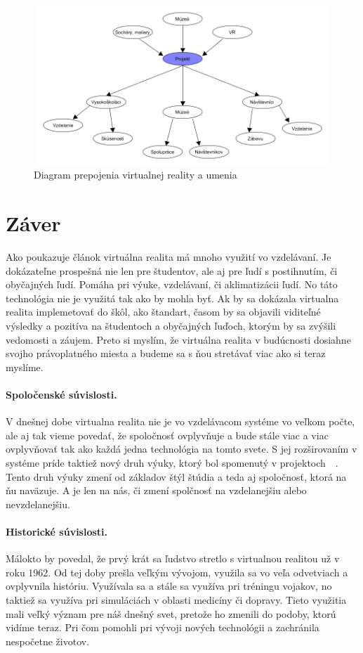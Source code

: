 \documentclass[10pt,oneside,slovak,a4paper]{article}
\begin{document}
 \begin{figure}[H]
 	\centering
 	\includegraphics[width=18cm,height=6cm,keepaspectratio]{diagram}
 	\caption[diagram]{Diagram prepojenia virtualnej reality a umenia}
 	\label{diagram}
 \end{figure} 

\section{Záver} \label{zaver} %

Ako poukazuje článok virtuálna realita má mnoho využití vo vzdelávaní. Je dokázateľne prospešná nie len pre študentov, ale aj pre ľudí s postihnutím, či obyčajných ľudí. Pomáha pri výuke, vzdelávaní, či aklimatizácii ľudí. No táto technológia nie je využitá tak ako by mohla byť. Ak by sa dokázala virtualna realita implemetovať do škôl, ako štandart, časom by sa objavili viditeľné výsledky a pozitíva na študentoch a obyčajných ľuďoch, ktorým by sa zvýšili vedomosti a záujem. Preto si myslím, že virtuálna realita v budúcnosti dosiahne svojho právoplatného miesta a budeme sa s ňou stretávať viac ako si teraz myslíme.

\paragraph{Spoločenské súvislosti.}V dnešnej dobe virtualna realita nie je vo vzdelávacom systéme vo veľkom počte, ale aj tak vieme povedať, že spoločnosť ovplyvňuje a bude stále viac a viac ovplyvňovať tak ako každá jedna technológia na tomto svete. S jej rozširovaním v systéme príde taktiež nový druh výuky, ktorý bol spomenutý v projektoch~\cite{Math}~\cite{Physics}. Tento druh výuky zmení od základov štýl štúdia a teda aj spoločnosť, ktorá na ňu naväzuje. A je len na nás, či zmení spolčnosť na vzdelanejšiu alebo nevzdelanejšiu.  

\paragraph{Historické súvislosti.}Málokto by povedal, že prvý krát sa ľudstvo stretlo s virtualnou realitou už v roku 1962. Od tej doby prešla veľkým vývojom, využila sa vo veľa odvetviach a ovplyvnila históriu. Využívala sa a stále sa využíva pri tréningu vojakov, no taktiež sa využíva pri simuláciách v oblasti medicíny či dopravy. Tieto využitia mali veľký význam pre náš dnešný svet, pretože ho zmenili do podoby, ktorú vidíme teraz. Pri čom pomohli pri vývoji nových technológii a zachránila nespočetne životov.  
\end{document}
